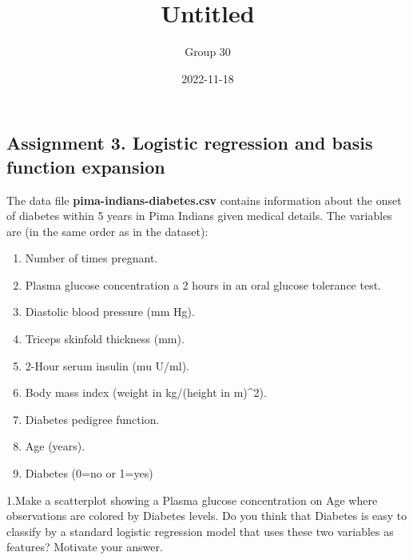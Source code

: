 \documentclass[
]{article}
\title{Untitled}
\author{Group 30}
\date{2022-11-18}
\providecommand{\tightlist}{%
  \setlength{\itemsep}{0pt}\setlength{\parskip}{0pt}}
\begin{document}
\maketitle

\hypertarget{assignment-3.-logistic-regression-and-basis-function-expansion}{%
\subsection{Assignment 3. Logistic regression and basis function
expansion}\label{assignment-3.-logistic-regression-and-basis-function-expansion}}

The data file \textbf{pima-indians-diabetes.csv} contains information
about the onset of diabetes within 5 years in Pima Indians given medical
details. The variables are (in the same order as in the dataset):

\begin{enumerate}
\def\labelenumi{\arabic{enumi}.}
\tightlist
\item
  Number of times pregnant.\\
\item
  Plasma glucose concentration a 2 hours in an oral glucose tolerance
  test.\\
\item
  Diastolic blood pressure (mm Hg).\\
\item
  Triceps skinfold thickness (mm).\\
\item
  2-Hour serum insulin (mu U/ml).\\
\item
  Body mass index (weight in kg/(height in m)\^{}2).\\
\item
  Diabetes pedigree function.\\
\item
  Age (years).\\
\item
  Diabetes (0=no or 1=yes)
\end{enumerate}

1.Make a scatterplot showing a Plasma glucose concentration on Age where
observations are colored by Diabetes levels. Do you think that Diabetes
is easy to classify by a standard logistic regression model that uses
these two variables as features? Motivate your answer.
\end{document}
